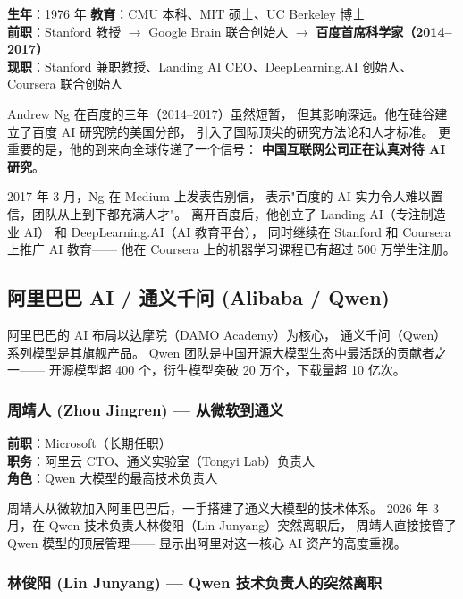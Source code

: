 \begin{keybox}
\textbf{生年}：1976 年 \quad \textbf{教育}：CMU 本科、MIT 硕士、UC Berkeley 博士 \\
\textbf{前职}：Stanford 教授 $\to$ Google Brain 联合创始人 $\to$ \textbf{百度首席科学家（2014--2017）} \\
\textbf{现职}：Stanford 兼职教授、Landing AI CEO、DeepLearning.AI 创始人、Coursera 联合创始人
\end{keybox}

Andrew Ng 在百度的三年（2014--2017）虽然短暂，
但其影响深远。他在硅谷建立了百度 AI 研究院的美国分部，
引入了国际顶尖的研究方法论和人才标准。
更重要的是，他的到来向全球传递了一个信号：
\textbf{中国互联网公司正在认真对待 AI 研究}。

2017 年 3 月，Ng 在 Medium 上发表告别信，
表示"百度的 AI 实力令人难以置信，团队从上到下都充满人才"。
离开百度后，他创立了 Landing AI（专注制造业 AI）
和 DeepLearning.AI（AI 教育平台），
同时继续在 Stanford 和 Coursera 上推广 AI 教育——
他在 Coursera 上的机器学习课程已有超过 500 万学生注册。


\subsection{阿里巴巴 AI / 通义千问 (Alibaba / Qwen)}

阿里巴巴的 AI 布局以达摩院（DAMO Academy）为核心，
通义千问（Qwen）系列模型是其旗舰产品。
Qwen 团队是中国开源大模型生态中最活跃的贡献者之一——
开源模型超 400 个，衍生模型突破 20 万个，下载量超 10 亿次。

\subsubsection{周靖人 (Zhou Jingren) — 从微软到通义}

\begin{keybox}
\textbf{前职}：Microsoft（长期任职） \\
\textbf{职务}：阿里云 CTO、通义实验室（Tongyi Lab）负责人 \\
\textbf{角色}：Qwen 大模型的最高技术负责人
\end{keybox}

周靖人从微软加入阿里巴巴后，一手搭建了通义大模型的技术体系。
2026 年 3 月，在 Qwen 技术负责人林俊阳（Lin Junyang）突然离职后，
周靖人直接接管了 Qwen 模型的顶层管理——
显示出阿里对这一核心 AI 资产的高度重视。

\subsubsection{林俊阳 (Lin Junyang) — Qwen 技术负责人的突然离职}

